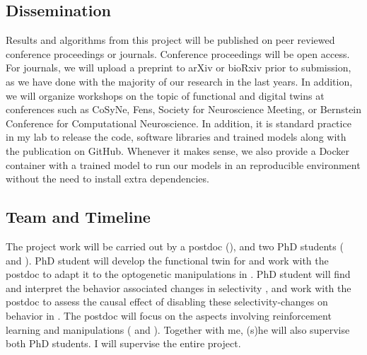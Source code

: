 \documentclass[B2,COG]{ercgrant}
\begin{document}
\subsection{Dissemination}
Results and algorithms from this project will be published on peer reviewed conference proceedings or journals. 
Conference proceedings will be open access.
For journals, we will upload a preprint to arXiv or bioRxiv prior to submission, as we have done with the majority of our research in the last years. 
In addition, we will organize workshops on the topic of functional and digital twins at conferences such as CoSyNe, Fens, Society for Neuroscience Meeting, or Bernstein Conference for Computational Neuroscience.
In addition, it is standard practice in my lab to release the code, software libraries and trained models along with the publication on GitHub.
Whenever it makes sense, we also provide a Docker container with a trained model to run our models in an reproducible environment without the need to install extra dependencies. 

\subsection{Team and Timeline}
The project work will be carried out by a postdoc (), and two PhD students ( and ). 
PhD student  will develop the functional twin for  and work with the postdoc to adapt it to the optogenetic manipulations in .
PhD student  will find and interpret the behavior associated changes in selectivity , and work with the postdoc to assess the causal effect of disabling these selectivity-changes on behavior in .
The postdoc  will focus on the aspects involving reinforcement learning and manipulations ( and ). 
Together with me, (s)he will also supervise both PhD students.
I will supervise the entire project.
\end{document}
